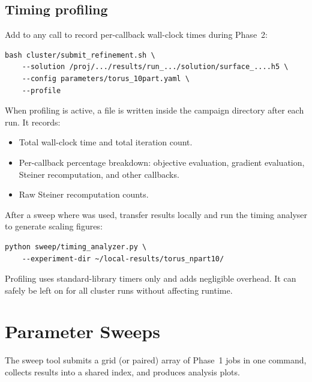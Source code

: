 \documentclass[11pt,a4paper]{article}
\begin{document}
\subsection{Timing profiling}
\label{sec:profiling}

Add  to any  call to record
per-callback wall-clock times during Phase~2:

\begin{lstlisting}[style=shell]
bash cluster/submit_refinement.sh \
    --solution /proj/.../results/run_.../solution/surface_....h5 \
    --config parameters/torus_10part.yaml \
    --profile
\end{lstlisting}

When profiling is active, a  file is written
inside the campaign directory after each run.  It records:

\begin{itemize}[leftmargin=1.5em]
  \item Total wall-clock time and total iteration count.
  \item Per-callback percentage breakdown: objective evaluation,
        gradient evaluation, Steiner recomputation, and other callbacks.
  \item Raw Steiner recomputation counts.
\end{itemize}

After a sweep where  was used, transfer results locally
and run the timing analyser to generate scaling figures:

\begin{lstlisting}[style=shell]
python sweep/timing_analyzer.py \
    --experiment-dir ~/local-results/torus_npart10/
\end{lstlisting}

\begin{tipbox}
Profiling uses standard-library timers only and adds negligible overhead.
It can safely be left on for all cluster runs without affecting runtime.
\end{tipbox}

\section{Parameter Sweeps}
\label{sec:sweeps}

The sweep tool submits a grid (or paired) array of Phase~1 jobs in one
command, collects results into a shared index, and produces analysis plots.
\end{document}
